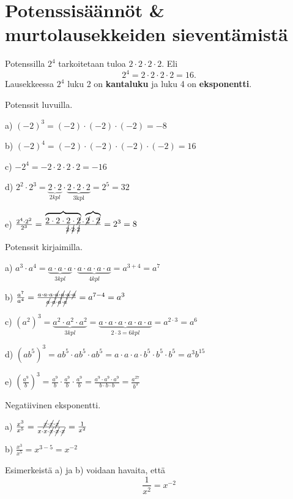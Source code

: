 \chapter{Potenssisäännöt \& murtolausekkeiden sieventämistä}
Potenssilla $2^4$ tarkoitetaan tuloa $2\cdot 2\cdot 2\cdot 2$. Eli
\begin{equation}
2^4=2\cdot 2\cdot 2\cdot 2=16.
\end{equation}
Lausekkeessa $2^4$ luku 2 on \textbf{kantaluku} ja luku 4 on \textbf{eksponentti}.

\begin{esimerkki}
Potenssit luvuilla.

a) $(-2)^3=(-2)\cdot (-2)\cdot (-2)=-8$

b) $(-2)^4=(-2)\cdot (-2)\cdot (-2)\cdot (-2)=16$

c) $-2^4=-2\cdot 2\cdot 2\cdot 2=-16$

d) $2^2\cdot 2^3=\underbrace{2\cdot 2}_{2 kpl}\cdot \underbrace{2\cdot 2\cdot 2}_{3 \text{kpl}}=2^5=32$

e) $\frac{2^4\cdot 2^2}{2^3}=\frac{\overbrace{2\cdot 2\cdot 2\cdot \cancel{2}}\cdot \overbrace{\cancel{2}\cdot \cancel{2}}}{\cancel{2}\cdot \cancel{2}\cdot \cancel{2}}=2^3=8$
\end{esimerkki}

\begin{esimerkki}
Potenssit kirjaimilla.

a) $a^3\cdot a^4=\underbrace{a\cdot a\cdot a}_{3 kpl}\cdot \underbrace{a\cdot a\cdot a\cdot a}_{4 kpl}=a^{3+4}=a^7$

b) $\frac{a^7}{a^4}=\frac{a\cdot a\cdot a\cdot \cancel{a}\cdot \cancel{a}\cdot \cancel{a}\cdot \cancel{a}}{\cancel{a}\cdot \cancel{a}\cdot \cancel{a}\cdot \cancel{a}}=a^{7-4}=a^3$

c) $(a^2)^3=\underbrace{a^2\cdot a^2\cdot a^2}_{3 kpl}=\underbrace{a\cdot a\cdot a\cdot a\cdot a\cdot a}_{2\cdot 3=6 kpl}=a^{2\cdot 3}=a^6$

d) $(ab^5)^3=ab^5\cdot ab^5\cdot ab^5=a\cdot a\cdot a\cdot b^5\cdot b^5\cdot b^5=a^3b^{15}$

e) $\left(\frac{a^9}{b}\right)^3=\frac{a^9}{b}\cdot \frac{a^9}{b}\cdot \frac{a^9}{b}=\frac{a^9\cdot a^9\cdot a^9}{b\cdot b\cdot b}=\frac{a^{27}}{b^3}$
\end{esimerkki}

\begin{esimerkki}
Negatiivinen eksponentti.

a) $\frac{x^3}{x^5}=\frac{\cancel{x}\cdot \cancel{x}\cdot \cancel{x}}{x\cdot x\cdot \cancel{x}\cdot \cancel{x}\cdot \cancel{x}}=\frac{1}{x^2}$

b) $\frac{x^3}{x^5}=x^{3-5}=x^{-2}$

Esimerkeistä a) ja b) voidaan havaita, että 
\begin{equation}
\frac{1}{x^2}=x^{-2}
\end{equation}


\end{esimerkki}

